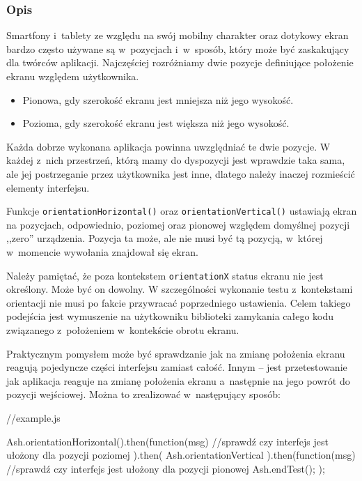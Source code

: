 \documentclass{xmgr}
\begin{document}
\subsubsection{Opis}

Smartfony i~tablety ze względu na swój mobilny charakter oraz dotykowy ekran bardzo często używane są w~pozycjach i~w~sposób, który może być zaskakujący dla twórców aplikacji. Najczęściej rozróżniamy dwie pozycje definiujące położenie ekranu względem użytkownika. 

\begin{itemize}
  \item Pionowa, gdy szerokość ekranu jest mniejsza niż jego wysokość.
  \item Pozioma, gdy szerokość ekranu jest większa niż jego wysokość.
\end{itemize}

Każda dobrze wykonana aplikacja powinna uwzględniać te dwie pozycje. W każdej z~nich przestrzeń, którą mamy do dyspozycji jest wprawdzie taka sama, ale jej postrzeganie przez użytkownika jest inne, dlatego należy inaczej rozmieścić elementy interfejsu.  

Funkcje \texttt{orientationHorizontal()} oraz \texttt{orientationVertical()} ustawiają ekran na pozycjach, odpowiednio, poziomej oraz pionowej względem domyślnej pozycji ,,zero'' urządzenia. Pozycja ta może, ale nie musi być tą pozycją, w~której w~momencie wywołania znajdował się ekran.  

Należy pamiętać, że poza kontekstem \texttt{orientationX} status ekranu nie jest określony. Może być on dowolny. W szczególności wykonanie testu z~kontekstami orientacji nie musi po fakcie przywracać poprzedniego ustawienia. Celem takiego podejścia jest wymuszenie na użytkowniku biblioteki zamykania całego kodu związanego z~położeniem w~kontekście obrotu ekranu. 

Praktycznym pomysłem może być sprawdzanie jak na zmianę położenia ekranu reagują pojedyncze części interfejsu zamiast całość. Innym -- jest przetestowanie jak aplikacja reaguje na zmianę położenia ekranu a~następnie na jego powrót do pozycji wejściowej. Można to zrealizować w~następujący sposób:

\begin{javascriptcode}
  //example.js

  Ash.orientationHorizontal().then(function(msg){
    //sprawdź czy interfejs jest ułożony dla pozycji poziomej
  }).then(
      Ash.orientationVertical
  ).then(function(msg){
    //sprawdź czy interfejs jest ułożony dla pozycji pionowej
    Ash.endTest();
  });
\end{javascriptcode}
\end{document}
